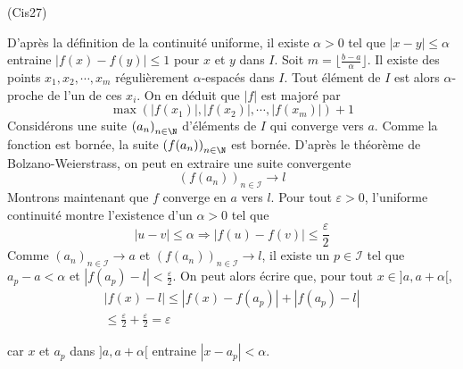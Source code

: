 \begin{tiny}(Cis27)\end{tiny} D'après la définition de la continuité uniforme, il existe $\alpha >0$ tel que $|x-y|\leq \alpha$ entraine $|f(x)-f(y)|\leq 1$ pour $x$ et $y$ dans $I$. Soit $m=\lfloor\frac{b-a}{\alpha}\rfloor$. Il existe des points $x_1, x_2,\cdots,x_m$ régulièrement $\alpha$-espacés dans $I$. Tout élément de $I$ est alors $\alpha$-proche de l'un de ces $x_i$. On en déduit que $|f|$ est majoré par
\begin{displaymath}
 \max(|f(x_1)|,|f(x_2)|,\cdots,|f(x_m)|) + 1
\end{displaymath}
Considérons une suite $\left( a_n\right) _{n\in \N}$ d'éléments de $I$ qui converge vers $a$. Comme la fonction est bornée, la suite $\left( f(a_n)\right) _{n\in \N}$ est bornée. D'après le théorème de Bolzano-Weierstrass, on peut en extraire une suite convergente
\begin{displaymath}
 \left( f(a_n)\right) _{n\in \mathcal I} \rightarrow l
\end{displaymath}
Montrons maintenant que $f$ converge en $a$ vers $l$.\newline
Pour tout $\varepsilon >0$, l'uniforme continuité montre l'existence d'un $\alpha >0$ tel que
\begin{displaymath}
 |u -v|\leq \alpha \Rightarrow |f(u)-f(v)|\leq \frac{\varepsilon}{2}
\end{displaymath}
Comme $\left(a_n\right) _{n\in \mathcal I} \rightarrow a$ et $\left( f(a_n)\right) _{n\in \mathcal I} \rightarrow l$, il existe un $p\in \mathcal I$ tel que $a_p - a < \alpha$ et $|f(a_p)-l| < \frac{\varepsilon}{2}$. On peut alors écrire que, pour tout $x\in ]a,a+\alpha[$,
\begin{multline*}
|f(x)-l|\leq |f(x)-f(a_p)| + |f(a_p)-l| \\
\leq \frac{\varepsilon}{2} + \frac{\varepsilon}{2} = \varepsilon
\end{multline*}

car $x$ et $a_p$ dans $]a,a+\alpha[$ entraine $|x-a_p|<\alpha$.
